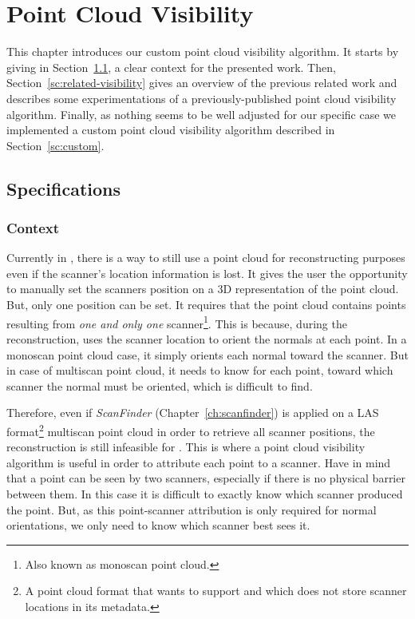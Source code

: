 \chapter{Point Cloud Visibility}
\label{ch:visibility}
This chapter introduces our custom point cloud visibility algorithm. It starts by giving in Section~\ref{sc:spec-visibility}, a clear context for the presented work. Then, Section~\ref{sc:related-visibility} gives an overview of the previous related work and describes some experimentations of a previously-published point cloud visibility algorithm. Finally, as nothing seems to be well adjusted for our specific case we implemented a custom point cloud visibility algorithm described in Section~\ref{sc:custom}.

\section{Specifications}
\label{sc:spec-visibility}

\subsection{Context}
Currently in \CC, there is a way to still use a point cloud for reconstructing purposes even if the scanner's location information is lost. It gives the user the opportunity to manually set the scanners position on a 3D representation of the point cloud. But, only one position can be set. It requires that the point cloud contains points resulting from \emph{one and only one} scanner\footnote{Also known as monoscan point cloud.}. This is because, during the reconstruction, \CC uses
the scanner location to orient the normals at each point. In a monoscan point cloud case, it simply orients each normal toward the scanner. But in case of multiscan point cloud, it needs to know for each point, toward which scanner the normal must be oriented, which is difficult to find.

Therefore, even if \emph{ScanFinder} (Chapter~\ref{ch:scanfinder}) is applied on a LAS format\footnote{A point cloud format that \CC wants to support and which does not store scanner locations in its metadata.} multiscan point cloud in order to retrieve all scanner positions, the reconstruction is still infeasible for \CC. This is where a point cloud visibility algorithm is useful in order to attribute each point to a scanner. Have in mind that a point can be seen by two scanners, especially if there is no physical barrier between them. In this case it is difficult to exactly know which scanner produced the point. But, as this point-scanner attribution is only required for normal orientations, we only need to know which scanner best sees it.


